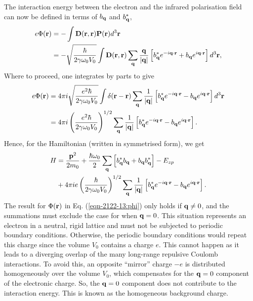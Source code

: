 The interaction energy between the electron and the infrared polarisation field can now be defined in terms of $b_{\vb{q}}$ and $b^*_{\vb{q}}$,
\begin{equation}
    \begin{aligned}
    e \Phi (\vb{r}) &= - \int \vb{D}(\vb{r}, \vb{r}) \vb{P}(\vb{r}) d^3\vb{r} \\
    &= -\sqrt{\frac{\hbar}{2\gamma\omega_0V_0}} \int \vb{D}(\vb{r}, \vb{r}) \sum_{\vb{q}} \frac{\vb{q}}{\abs{\vb{q}}} \left[b_{\vb{q}}^* e^{-i\vb{q}\cdot\vb{r}} + b_{\vb{q}} e^{i\vb{q}\cdot\vb{r}} \right] d^3\vb{r},
    \end{aligned}
\label{eqn-2122-12}
\end{equation}
Where to proceed, one integrates by parts to give
\begin{equation} 
    \begin{aligned}
    e \Phi (\vb{r}) &= 4\pi i \sqrt{\frac{e^2 \hbar}{2\gamma\omega_0V_0}} \int \delta(\vb{r} - \vb{r}) \sum_{\vb{q}} \frac{1}{\abs{\vb{q}}} \left[b_{\vb{q}}^* e^{-i\vb{q}\cdot\vb{r}} - b_{\vb{q}} e^{i\vb{q}\cdot\vb{r}} \right] d^3\vb{r} \\
    &= 4\pi i \left( \frac{e^2 \hbar}{2 \gamma \omega_0 V_0} \right)^{1/2} \sum_{\vb{q}} \frac{1}{\abs{\vb{q}}} \left[b_{\vb{q}}^* e^{-i\vb{q} \cdot \vb{r}} - b_{\vb{q}} e^{i\vb{q} \cdot \vb{r}}\right].
    \end{aligned}
\label{eqn-2122-13:phi}
\end{equation}
Hence, for the Hamiltonian (written in symmetrised form), we get
\begin{equation}
\begin{aligned}
    H &= \frac{\vb{p}^2}{2m_0} + \frac{\hbar \omega_0}{2} \sum_{\vb{q}} \left[b_{\vb{q}}^* b_{\vb{q}} + b_{\vb{q}} b^*_{\vb{q}}\right] - E_{zp} \\
    &+ 4\pi i e \left( \frac{\hbar}{2 \gamma \omega_0 V_0} \right)^{1/2} \sum_{\vb{q}} \frac{1}{\abs{\vb{q}}} \left[ b_{\vb{q}}^* e^{-i\vb{q} \cdot \vb{r}} - b_{\vb{q}} e^{i\vb{q} \cdot \vb{r}}\right].
\end{aligned}
\label{eqn-2122-14}
\end{equation}
The result for $\Phi (\vb{r})$ in Eq. (\ref{eqn-2122-13:phi}) only holds if $\vb{q} \neq 0$, and the summations must exclude the case for when $\vb{q} = 0$. This situation represents an electron in a neutral, rigid lattice and must not be subjected to periodic boundary conditions. Otherwise, the periodic boundary conditions would repeat this charge since the volume $V_0$ contains a charge $e$. This cannot happen as it leads to a diverging overlap of the many long-range repulsive Coulomb interactions. To avoid this, an opposite ``mirror'' charge $-e$ is distributed homogeneously over the volume $V_0$, which compensates for the $\vb{q} = 0$ component of the electronic charge. So, the $\vb{q} = 0$ component does not contribute to the interaction energy. This is known as the homogeneous background charge. 

